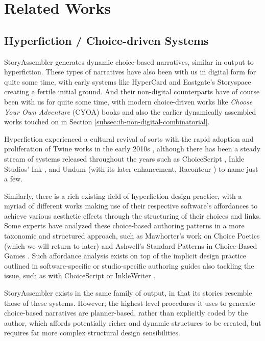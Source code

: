 \section{Related Works}

\subsection{Hyperfiction / Choice-driven Systems}
\label{sec:sa-hyperfiction}

StoryAssembler generates dynamic choice-based narratives, similar in output to hyperfiction. These types of narratives have also been with us in digital form for quite some time, with early systems like HyperCard \cite{hypercard} and Eastgate's Storyspace \cite{eastgate} creating a fertile initial ground. And their non-digital counterparts have of course been with us for quite some time, with modern choice-driven works like \textit{Choose Your Own Adventure} (CYOA) books and also the earlier dynamically assembled works touched on in Section \ref{subsec:ib-non-digital-combinatorial}.

Hyperfiction experienced a cultural revival of sorts with the rapid adoption and proliferation of Twine works in the early 2010s \cite{twinePlatform}, although there has been a steady stream of systems released throughout the years such as ChoiceScript \cite{choicescript}, Inkle Studios' Ink \cite{ink}, and Undum \cite{undum} (with its later enhancement, Raconteur \cite{raconteur}) to name just a few.

Similarly, there is a rich existing field of hyperfiction design practice, with a myriad of different works making use of their respective software's affordances to achieve various aesthetic effects through the structuring of their choices and links. Some experts have analyzed these choice-based authoring patterns in a more taxonomic and structured approach, such as Mawhorter's work on Choice Poetics \cite{mawhorter} (which we will return to later) and Ashwell's Standard Patterns in Choice-Based Games \cite{ashwell}. Such affordance analysis exists on top of the implicit design practice outlined in software-specific or studio-specific authoring guides also tackling the issue, such as with ChoiceScript \cite{choicescriptGuide} or InkleWriter \cite{inklewriterGuide}. 

StoryAssembler exists in the same family of output, in that its stories resemble those of these systems. However, the highest-level procedures it uses to generate choice-based narratives are planner-based, rather than explicitly coded by the author, which affords potentially richer and dynamic structures to be created, but requires far more complex structural design sensibilities.

